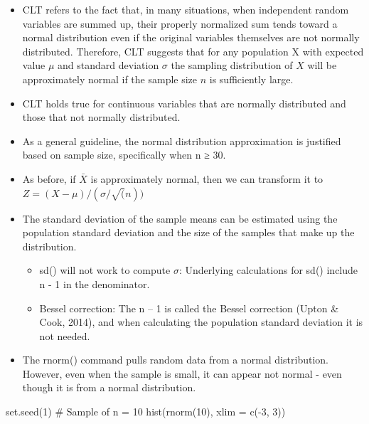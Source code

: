 \documentclass[
  letterpaper,
  DIV=11,
  numbers=noendperiod]{scrreprt}
\newenvironment{Shaded}{\begin{snugshade}}{\end{snugshade}}
\newcommand{\AttributeTok}[1]{\textcolor[rgb]{0.40,0.45,0.13}{#1}}
\newcommand{\CommentTok}[1]{\textcolor[rgb]{0.37,0.37,0.37}{#1}}
\newcommand{\DecValTok}[1]{\textcolor[rgb]{0.68,0.00,0.00}{#1}}
\newcommand{\FunctionTok}[1]{\textcolor[rgb]{0.28,0.35,0.67}{#1}}
\newcommand{\NormalTok}[1]{\textcolor[rgb]{0.00,0.23,0.31}{#1}}
\newcommand{\SpecialCharTok}[1]{\textcolor[rgb]{0.37,0.37,0.37}{#1}}
\providecommand{\tightlist}{%
  \setlength{\itemsep}{0pt}\setlength{\parskip}{0pt}}\usepackage{longtable,booktabs,array}
\begin{document}
\begin{itemize}
\item
  CLT refers to the fact that, in many situations, when independent
  random variables are summed up, their properly normalized sum tends
  toward a normal distribution even if the original variables themselves
  are not normally distributed. Therefore, CLT suggests that for any
  population X with expected value \(\mu\) and standard deviation
  \(\sigma\) the sampling distribution of \(X\) will be approximately
  normal if the sample size \(n\) is sufficiently large.
\item
  CLT holds true for continuous variables that are normally distributed
  and those that not normally distributed.
\item
  As a general guideline, the normal distribution approximation is
  justified based on sample size, specifically when n ≥ 30.
\item
  As before, if \(\bar{X}\) is approximately normal, then we can
  transform it to \(𝑍=(𝑋- \mu)/(\sigma/\sqrt(n))\)
\item
  The standard deviation of the sample means can be estimated using the
  population standard deviation and the size of the samples that make up
  the distribution.

  \begin{itemize}
  \tightlist
  \item
    sd() will not work to compute \(\sigma\): Underlying calculations
    for sd() include n - 1 in the denominator.
  \item
    Bessel correction: The n -- 1 is called the Bessel correction (Upton
    \& Cook, 2014), and when calculating the population standard
    deviation it is not needed.
  \end{itemize}
\item
  The rnorm() command pulls random data from a normal distribution.
  However, even when the sample is small, it can appear not normal -
  even though it is from a normal distribution.
\end{itemize}

\begin{Shaded}
\begin{Highlighting}[]
\FunctionTok{set.seed}\NormalTok{(}\DecValTok{1}\NormalTok{)}
\CommentTok{\# Sample of n = 10}
\FunctionTok{hist}\NormalTok{(}\FunctionTok{rnorm}\NormalTok{(}\DecValTok{10}\NormalTok{), }\AttributeTok{xlim =} \FunctionTok{c}\NormalTok{(}\SpecialCharTok{{-}}\DecValTok{3}\NormalTok{, }\DecValTok{3}\NormalTok{))}
\end{Highlighting}
\end{Shaded}
\end{document}
